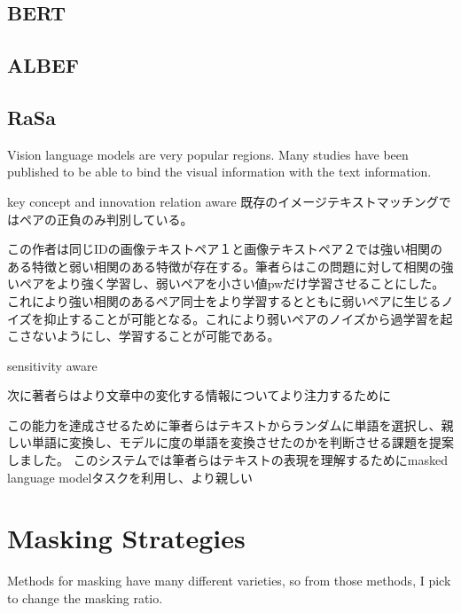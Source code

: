 \subsection{BERT}


\subsection{ALBEF}

\subsection{RaSa}

Vision language models are very popular regions. Many studies have been published to be able to bind the visual information with the text information. 

key concept and innovation
relation aware
既存のイメージテキストマッチングではペアの正負のみ判別している。


この作者は同じIDの画像テキストペア１と画像テキストペア２では強い相関のある特徴と弱い相関のある特徴が存在する。筆者らはこの問題に対して相関の強いペアをより強く学習し、弱いペアを小さい値pwだけ学習させることにした。これにより強い相関のあるペア同士をより学習するとともに弱いペアに生じるノイズを抑止することが可能となる。これにより弱いペアのノイズから過学習を起こさないようにし、学習することが可能である。

sensitivity aware

次に著者らはより文章中の変化する情報についてより注力するために

この能力を達成させるために筆者らはテキストからランダムに単語を選択し、親しい単語に変換し、モデルに度の単語を変換させたのかを判断させる課題を提案しました。
このシステムでは筆者らはテキストの表現を理解するためにmasked language modelタスクを利用し、より親しい


\section{Masking Strategies}
Methods for masking have many different varieties, so from those methods, I pick to change the masking ratio.